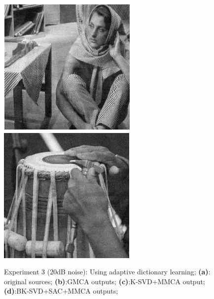 \begin{figure}[!htbp]
{\begin{minipage}[b]{0.17\linewidth}
\includegraphics[width=1\linewidth]{images/bk2.png}\vspace{4pt}
\includegraphics[width=1\linewidth]{images/bk4.png}
\end{minipage}}
\caption{Experiment 3 (20dB noise): Using adaptive dictionary learning; \textbf{(a)}: original sources; \textbf{(b)}:GMCA outputs; \textbf{(c)}:K-SVD+MMCA output; \textbf{(d)}:BK-SVD+SAC+MMCA outputs;}
\label{apt_compare}
\end{figure}

